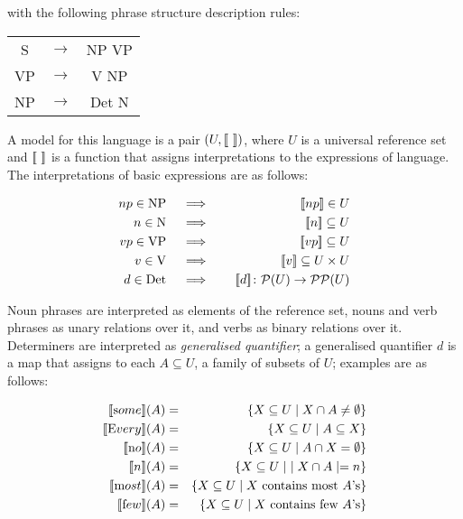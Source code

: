 \noindent
with the   following phrase structure description rules:

\begin{center}
\begin{tabular}{ccc}
S & $\to$ & NP VP \\
VP & $\to$ & V NP \\
NP &$\to$ & Det N \\
\end{tabular}
\end{center}


\noindent
A model for this language is a pair $(U, [\![ \  ]\!])$, where $U$ is a universal reference set and $\semantics{\ }$ is a function that assigns interpretations to the expressions of  language. The  interpretations   of basic expressions  are  as follows:  

\begin{eqnarray*}
np \in \text{NP}  &\quad \implies \quad &  \semantics{np}   \in U   \\
n \in \text{N} &\quad \implies \quad& \semantics{n}  \subseteq U \\
vp \in  \text{VP} &\quad \implies \quad& \semantics{vp}  \subseteq U \\
v \in \text{V} &\quad \implies \quad& \semantics{v} \subseteq U \times U   \\
d \in \text{Det} &\quad \implies \quad& \semantics{d} \colon {\cal P}(U) \to {\cal P}{\cal P}(U)
\end{eqnarray*}


\noindent
Noun phrases are interpreted as elements of the reference set, nouns and verb phrases as unary relations over it, and verbs as binary relations over it.  Determiners are interpreted as \emph{generalised quantifier};  a  generalised quantifier $d$  is a map that  assigns to each $A \subseteq U$, a family of subsets of $U$; examples are as follows:

\begin{eqnarray*}
\semantics{\text some}(A) &=& \{X \subseteq U \mid X \cap A \neq \emptyset\}\\
\semantics{\text Every}(A) &=& \{X \subseteq U \mid A \subseteq X\}\\
\semantics{\text no}(A) &=& \{X \subseteq U \mid  A \cap X = \emptyset\}\\
\semantics{n}(A) &=& \{X \subseteq U \mid \ \mid X \cap A \mid = n\}\\
\semantics{\text most}(A) &=& \{X \subseteq U \mid X \  \mbox{contains most} \ A\text{'s}\}\\
\semantics{\text few}(A) &=& \{X \subseteq U \mid  X \  \mbox{contains few} \ A\text{'s}\}
\end{eqnarray*}
 

